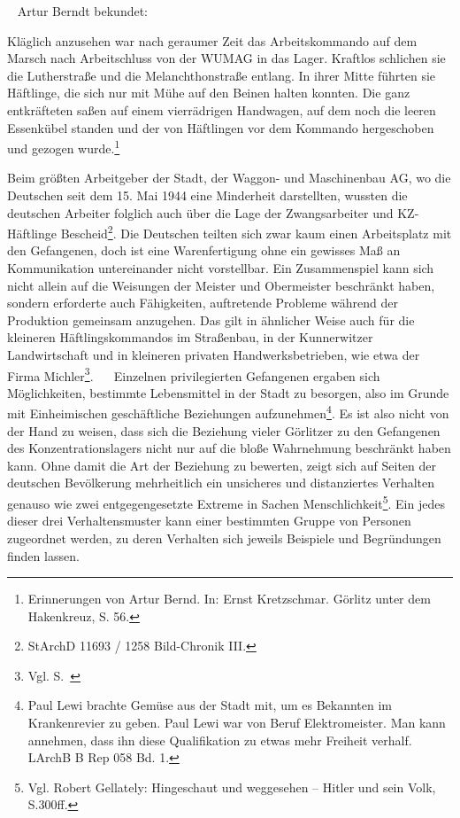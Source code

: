 ~\newline
Artur Berndt bekundet:
\begin{leftbar}
Kläglich anzusehen war nach geraumer Zeit das Arbeitskommando auf dem Marsch nach Arbeitschluss von der WUMAG in das Lager. Kraftlos schlichen sie die Lutherstraße und die Melanchthonstraße entlang. In ihrer Mitte führten sie Häftlinge, die sich nur mit Mühe auf den Beinen halten konnten. Die ganz entkräfteten saßen auf einem vierrädrigen Handwagen, auf dem noch die leeren Essenkübel standen und der von Häftlingen vor dem Kommando hergeschoben und gezogen wurde.\footnote{Erinnerungen von Artur Bernd. In: Ernst Kretzschmar. Görlitz unter dem Hakenkreuz, S. 56.}
\end{leftbar}
Beim größten Arbeitgeber der Stadt, der Waggon- und Maschinenbau AG, wo die Deutschen seit dem 15. Mai 1944 eine Minderheit darstellten, wussten die deutschen Arbeiter folglich auch über die Lage der Zwangsarbeiter und KZ-Häftlinge Bescheid\footnote{StArchD 11693 / 1258 Bild-Chronik III.}. Die Deutschen teilten sich zwar kaum einen Arbeitsplatz mit den Gefangenen, doch ist eine Warenfertigung ohne ein gewisses Maß an Kommunikation untereinander nicht vorstellbar. Ein Zusammenspiel kann sich nicht allein auf die Weisungen der Meister und Obermeister beschränkt haben, sondern erforderte auch Fähigkeiten, auftretende Probleme während der Produktion gemeinsam anzugehen. Das gilt in ähnlicher Weise auch für die kleineren Häftlingskommandos im Straßenbau, in der Kunnerwitzer Landwirtschaft und in kleineren privaten Handwerksbetrieben, wie etwa der Firma Michler\footnote{Vgl. S.~\pageref{michel}}.
~\newline~
Einzelnen privilegierten Gefangenen ergaben sich Möglichkeiten, bestimmte Lebensmittel in der Stadt zu besorgen, also im Grunde mit Einheimischen geschäftliche Beziehungen aufzunehmen\footnote{Paul Lewi brachte Gemüse aus der Stadt mit, um es Bekannten im Krankenrevier zu geben. Paul Lewi war von Beruf Elektromeister. Man kann annehmen, dass ihn diese Qualifikation zu etwas mehr Freiheit verhalf. LArchB B Rep 058 Bd. 1.}.
\newline
Es ist also nicht von der Hand zu weisen, dass sich die Beziehung vieler Görlitzer zu den Gefangenen des Konzentrationslagers nicht nur auf die bloße Wahrnehmung beschränkt haben kann. Ohne damit die Art der Beziehung zu bewerten, zeigt sich auf Seiten der deutschen Bevölkerung mehrheitlich ein unsicheres und distanziertes Verhalten genauso wie zwei entgegengesetzte Extreme in Sachen Menschlichkeit\footnote{Vgl. Robert Gellately: Hingeschaut und weggesehen -- Hitler und sein Volk, S.300ff.}.
Ein jedes dieser drei Verhaltensmuster kann einer bestimmten Gruppe von Personen zugeordnet werden, zu deren Verhalten sich jeweils Beispiele und Begründungen finden lassen.

